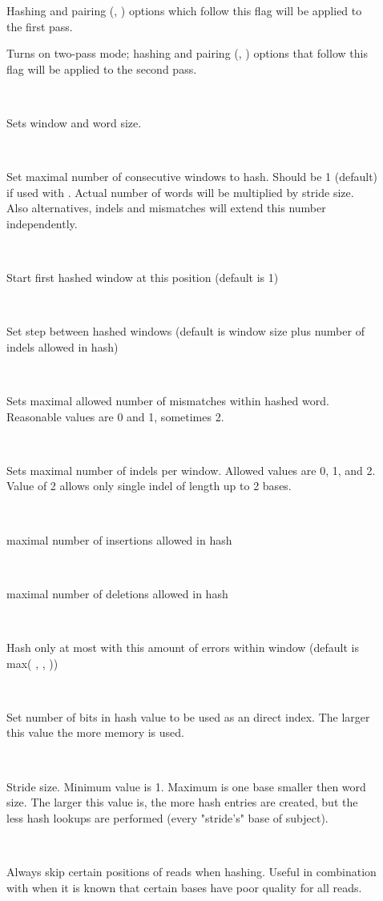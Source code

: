 \documentclass[english,letter]{article}
\begin{document}
\begin{description}
\item[]
				Hashing and pairing (, ) options which follow this flag will 
                be applied to the first pass.
\item[]
				Turns on two-pass mode; hashing and pairing (, ) options  
                that follow this flag will be applied to the second pass.
\item[~~]
                Sets window and word size.
\item[~~]
				Set maximal number of consecutive windows to hash.
                Should be 1 (default) if used with . Actual number of words
                will be multiplied by stride size. Also alternatives, indels 
                and mismatches will extend this number independently.
\item[~~]
				Start first hashed window at this position (default is 1)
\item[~~]
				Set step between hashed windows (default is window size plus 
                number of indels allowed in hash)
\item[~~]
				Sets maximal allowed number of mismatches within hashed word.
                Reasonable values are 0 and 1, sometimes 2.
\item[~~]
				Sets maximal number of indels per window. Allowed values are 
                0, 1, and 2.  Value of 2 allows only single indel of length 
                up to 2 bases.
\item[~~]
				maximal number of insertions allowed in hash
\item[~~]
				maximal number of deletions allowed in hash
\item[~~]
				Hash only at most with this amount of errors within window 
                (default is max( , ,  ))
\item[~~]
				Set number of bits in hash value to be used as an direct index.
                The larger this value the more memory is used.
\item[~~]
				Stride size. Minimum value is 1. Maximum is one base smaller 
                then word size. The larger this value is, the more hash 
                entries are created, but the less hash lookups are performed
                (every "stride's" base of subject). 
\item[~~]
				Always skip certain positions of reads when hashing.
                Useful in combination with  when it is known that certain
                bases have poor quality for all reads.


\end{description}
\end{document}
